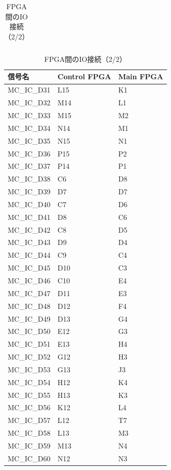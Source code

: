 \documentclass[dvipdfmx]{jlreq}
\begin{document}
\begin{table}[htbp]
\begin{minipage}[t]{0.48\textwidth}
\begin{tabular}{|l|l|l|}
    \end{tabular}
  \end{minipage}\hfill
  \begin{minipage}[t]{0.48\textwidth}
    \centering
    \caption{FPGA間のIO接続（2/2）}
    \label{tab:interconnect2}
    \begin{tabular}{|l|l|l|} \hline
       信号名 & Control FPGA & Main FPGA \\ \hline \hline
    MC\_IC\_D31 & L15 & K1 \\
    MC\_IC\_D32 & M14 & L1 \\
    MC\_IC\_D33 & M15 & M2 \\
    MC\_IC\_D34 & N14 & M1 \\
    MC\_IC\_D35 & N15 & N1 \\
    MC\_IC\_D36 & P15 & P2 \\
    MC\_IC\_D37 & P14 & P1 \\
    MC\_IC\_D38 & C6 & D8 \\
    MC\_IC\_D39 & D7 & D7 \\
    MC\_IC\_D40 & C7 & D6 \\
    MC\_IC\_D41 & D8 & C6 \\
    MC\_IC\_D42 & C8 & D5 \\
    MC\_IC\_D43 & D9 & D4 \\
    MC\_IC\_D44 & C9 & C4 \\
    MC\_IC\_D45 & D10 & C3 \\
    MC\_IC\_D46 & C10 & E4 \\
    MC\_IC\_D47 & D11 & E3 \\
    MC\_IC\_D48 & D12 & F4 \\
    MC\_IC\_D49 & D13 & G4 \\
    MC\_IC\_D50 & E12 & G3 \\
    MC\_IC\_D51 & E13 & H4 \\
    MC\_IC\_D52 & G12 & H3 \\
    MC\_IC\_D53 & G13 & J3 \\
    MC\_IC\_D54 & H12 & K4 \\
    MC\_IC\_D55 & H13 & K3 \\
    MC\_IC\_D56 & K12 & L4 \\
    MC\_IC\_D57 & L12 & T7 \\
    MC\_IC\_D58 & L13 & M3 \\
    MC\_IC\_D59 & M13 & N4 \\
    MC\_IC\_D60 & N12 & N3 \\

\end{tabular}
\end{minipage}
\end{table}
\end{document}
